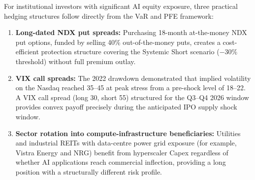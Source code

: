 For institutional investors with significant AI equity exposure, three practical
hedging structures follow directly from the VaR and PFE framework:

\begin{enumerate}
  \item \textbf{Long-dated NDX put spreads:} Purchasing 18-month at-the-money NDX
        put options, funded by selling 40\% out-of-the-money puts, creates a
        cost-efficient protection structure covering the Systemic Short scenario
        ($-30\%$ threshold) without full premium outlay.

  \item \textbf{VIX call spreads:} The 2022 drawdown demonstrated that implied
        volatility on the Nasdaq reached 35--45 at peak stress from a pre-shock level
        of 18--22. A VIX call spread (long 30, short 55) structured for the Q3--Q4
        2026 window provides convex payoff precisely during the anticipated IPO
        supply shock window.

  \item \textbf{Sector rotation into compute-infrastructure beneficiaries:}
        Utilities and industrial REITs with data-centre power grid exposure
        (for example, Vistra Energy and NRG) benefit from hyperscaler Capex regardless
        of whether AI applications reach commercial inflection, providing a long
        position with a structurally different risk profile.
\end{enumerate}
